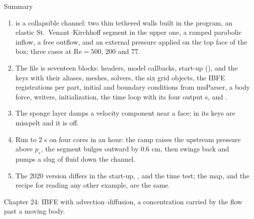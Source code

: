 \documentclass[aspectratio=169,11pt]{beamer}
\begin{document}
\begin{frame}{Summary}
\label{fr:summary}
\footnotesize
\begin{enumerate}
  \item {} is a collapsible channel: two thin tethered walls built in the program, an elastic St.\ Venant--Kirchhoff segment in the upper one, a ramped parabolic inflow, a free outflow, and an external pressure applied on the top face of the box; three cases at $\mathrm{Re} = 500$, $200$ and $77$.
  \item The file is seventeen blocks: headers, model callbacks, start-up (),  and the  keys with their aliases, meshes, solvers, the six grid objects, the IBFE registrations per part, initial and boundary conditions from muParser, a body force, writers, initialization, the time loop with its four output s, and .
  \item The sponge layer damps a velocity component near a face; in  its keys are misspelt and it is off.
  \item Run to $2$ s on four cores in an hour: the ramp raises the upstream pressure above $p_e$, the segment bulges outward by $0.6$ cm, then swings back and pumps a slug of fluid down the channel.
  \item The 2020 version differs in the start-up, ,  and the time test; the map, and the recipe for reading any other example, are the same.
\end{enumerate}
\begin{homebox}
\footnotesize Chapter 24: IBFE with advection--diffusion, a concentration carried by the flow past a moving body.
\end{homebox}
\end{frame}
\end{document}
